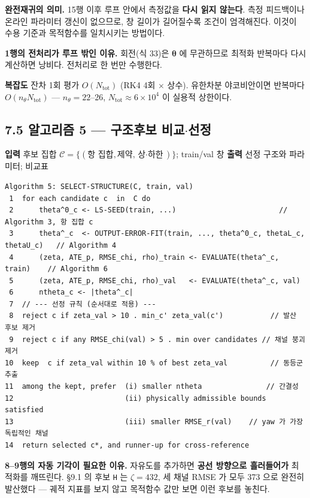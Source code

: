 \documentclass[10pt,a4paper]{article}
\begin{document}
\textbf{완전재귀의 의미.} 15행 이후 루프 안에서 측정값을 \textbf{다시 읽지 않는다}. 측정 피드백이나 온라인 파라미터 갱신이 없으므로, 창 길이가 길어질수록 조건이 엄격해진다. 이것이 수용 기준과 목적함수를 일치시키는 방법이다.

\textbf{1행의 전처리가 루프 밖인 이유.} 회전(식 33)은 $\boldsymbol{\theta}$ 에 무관하므로 최적화 반복마다 다시 계산하면 낭비다. 전처리로 한 번만 수행한다.

\textbf{복잡도} 잔차 1회 평가 $O(N_{\text{tot}})$ (RK4 4회 $\times$ 상수). 유한차분 야코비안이면 반복마다 $O(n_\theta N_{\text{tot}})$ --- $n_\theta = 22$--26, $N_{\text{tot}} \approx 6\times10^4$ 이 실용적 상한이다.

\subsection*{7.5 알고리즘 5 --- 구조후보 비교$\cdot$선정}

\textbf{입력} 후보 집합 $\mathcal{C} = \{(\text{항 집합}, \text{제약}, \text{상$\cdot$하한})\}$; train/val 창 \textbf{출력} 선정 구조와 파라미터; 비교표

\begin{Verbatim}[fontsize=\footnotesize,frame=single,framesep=2.2mm,rulecolor=\color{black!35}]
Algorithm 5: SELECT-STRUCTURE(C, train, val)
 1  for each candidate c  in  C do
 2      theta^0_c <- LS-SEED(train, ...)                        // Algorithm 3, 항 집합 c
 3      theta^_c  <- OUTPUT-ERROR-FIT(train, ..., theta^0_c, thetaL_c, thetaU_c)   // Algorithm 4
 4      (zeta, ATE_p, RMSE_chi, rho)_train <- EVALUATE(theta^_c, train)    // Algorithm 6
 5      (zeta, ATE_p, RMSE_chi, rho)_val   <- EVALUATE(theta^_c, val)
 6      ntheta_c <- |theta^_c|
 7  // --- 선정 규칙 (순서대로 적용) ---
 8  reject c if zeta_val > 10 . min_c' zeta_val(c')           // 발산 후보 제거
 9  reject c if any RMSE_chi(val) > 5 . min over candidates // 채널 붕괴 제거
10  keep  c if zeta_val within 10 % of best zeta_val          // 동등군 추출
11  among the kept, prefer  (i) smaller ntheta               // 간결성
12                          (ii) physically admissible bounds satisfied
13                          (iii) smaller RMSE_r(val)    // yaw 가 가장 독립적인 채널
14  return selected c*, and runner-up for cross-reference
\end{Verbatim}

\textbf{8--9행의 자동 기각이 필요한 이유.} 자유도를 추가하면 \textbf{공선 방향으로 흘러들어가} 최적화를 깨뜨린다. \S{}9.1 의 후보 \texttt{H} 는 $\zeta = 432$, 세 채널 RMSE 가 모두 373 으로 완전히 발산했다 --- 궤적 지표를 보지 않고 목적함수 값만 보면 이런 후보를 놓친다.
\end{document}
